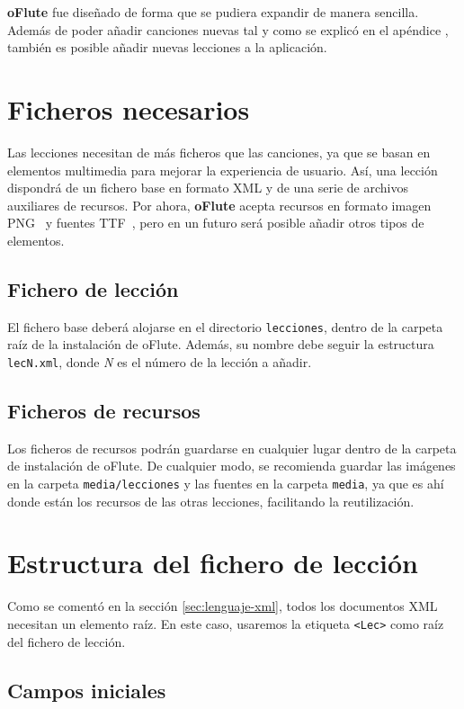 \textbf{oFlute} fue diseñado de forma que se pudiera expandir de manera
sencilla. Además de poder añadir canciones nuevas tal y como se explicó en el
apéndice \textit{}, también es posible añadir
nuevas lecciones a la aplicación.

\section{Ficheros necesarios}

Las lecciones necesitan de más ficheros que las canciones, ya que se basan en
elementos multimedia para mejorar la experiencia de usuario. Así, una lección
dispondrá de un fichero base en formato XML y de una serie de archivos
auxiliares de recursos. Por ahora, \textbf{oFlute} acepta recursos en formato
imagen PNG~\cite{refpng} y fuentes TTF~\cite{reftruetype}, pero en un futuro
será posible añadir otros tipos de elementos.

\subsection{Fichero de lección}
El fichero base deberá alojarse en el directorio \texttt{lecciones}, dentro de
la carpeta raíz de la instalación de oFlute. Además, su nombre debe seguir la
estructura \texttt{lecN.xml}, donde \textit{N} es el número de la lección a
añadir.

\subsection{Ficheros de recursos}
Los ficheros de recursos podrán guardarse en cualquier lugar dentro de la
carpeta de instalación de oFlute. De cualquier modo, se recomienda guardar las
imágenes en la carpeta \texttt{media/lecciones} y las fuentes en la carpeta
\texttt{media}, ya que es ahí donde están los recursos de las otras lecciones,
facilitando la reutilización.

\section{Estructura del fichero de lección}

Como se comentó en la sección \ref{sec:lenguaje-xml}, todos los documentos XML
necesitan un elemento raíz. En este caso, usaremos la etiqueta \texttt{<Lec>}
como raíz del fichero de lección.


\subsection{Campos iniciales}

